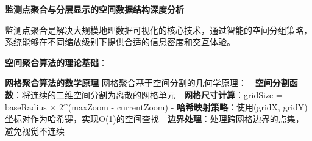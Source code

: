 \begin{Shaded}
\begin{Highlighting}[]
        \OperatorTok{=} \NormalTok{(} \OperatorTok{+} \OperatorTok{*} \OperatorTok{,} \NormalTok{)}\OperatorTok{;}
        \OperatorTok{=} \NormalTok{(}
            \OperatorTok{,} \NormalTok{)}\OperatorTok{,}
            \NormalTok{(\{}
                \OperatorTok{:} \OperatorTok{,}
                \OperatorTok{:} \OperatorTok{,} \OperatorTok{:} 
\NormalTok{            \})}
\NormalTok{        )}\OperatorTok{;}
\OperatorTok{;}
        
        \OperatorTok{=} \OperatorTok{;}
\OperatorTok{;}
        
        \OperatorTok{;}
\NormalTok{    \}}
\NormalTok{\}}
\end{Highlighting}
\end{Shaded}

\textbf{监测点聚合与分层显示的空间数据结构深度分析}

监测点聚合是解决大规模地理数据可视化的核心技术，通过智能的空间分组策略，系统能够在不同缩放级别下提供合适的信息密度和交互体验。

\textbf{空间聚合算法的理论基础}：

\textbf{网格聚合算法的数学原理} 网格聚合基于空间分割的几何学原理： - \textbf{空间分割函数}：将连续的二维空间分割为离散的网格单元 - \textbf{网格尺寸计算}：gridSize = baseRadius × 2\^{}(maxZoom - currentZoom) - \textbf{哈希映射策略}：使用(gridX, gridY)坐标对作为哈希键，实现O(1)的空间查找 - \textbf{边界处理}：处理跨网格边界的点集，避免视觉不连续

